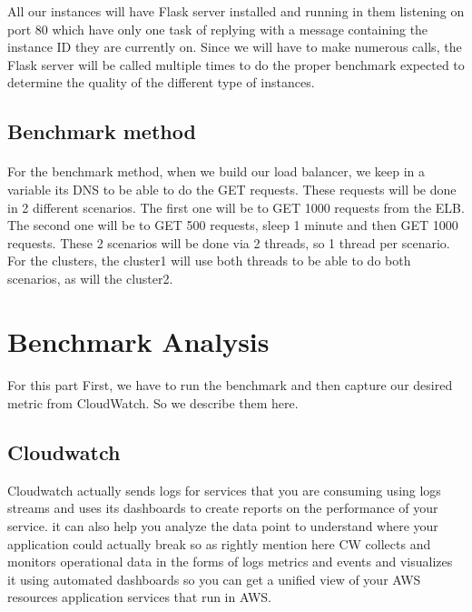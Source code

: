 \documentclass[12pt]{article}
\begin{document}
		All our instances will have Flask server installed and running in them listening on port 80 which have only one task of replying
		with a message containing the instance ID they are currently on. Since we will have to make numerous calls, the Flask server 
		will be called multiple times to do the proper benchmark expected to determine the quality of the different type of instances.
		\bigskip

	\subsection{Benchmark method}
		\paragraph{} For the benchmark method, when we build our load balancer, we keep in a variable its DNS to be able to do the GET requests.
		These requests will be done in 2 different scenarios. The first one will be to GET 1000 requests from the ELB. The second one will be to 
		GET 500 requests, sleep 1 minute and then GET 1000 requests. These 2 scenarios will be done via 2 threads, so 1 thread per scenario. For 
		the clusters, the cluster1 will use both threads to be able to do both scenarios, as will the cluster2.
		\bigskip
		\pagebreak

\section{Benchmark Analysis} \label{sec:benchmark}
	\paragraph{} For  this part First, we have to run the benchmark and then capture our desired metric from CloudWatch. So we describe them here.
        \subsection{Cloudwatch}
        Cloudwatch actually sends logs for services that you are consuming using logs streams and uses its dashboards to create reports on the performance of your service. it can also help you analyze the data point to understand where your application could actually break so as rightly mention here CW collects and monitors operational data in the forms of logs metrics and events and visualizes it using automated dashboards  so you can get a unified view of your AWS resources application services that run in AWS.
\end{document}

